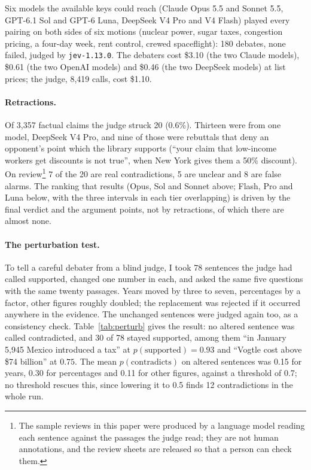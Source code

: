 \documentclass[11pt,a4paper]{article}
\newcommand{\pc}{$p(\text{contradicts})$}
\begin{document}
Six models the available keys could reach (Claude Opus 5.5 and Sonnet 5.5, GPT-6.1 Sol and GPT-6 Luna, DeepSeek V4 Pro and V4 Flash) played every pairing on both sides of six motions (nuclear power, sugar taxes, congestion pricing, a four-day week, rent control, crewed spaceflight): 180 debates, none failed, judged by \texttt{jev-1.13.0}. The debaters cost \$3.10 (the two Claude models), \$0.61 (the two OpenAI models) and \$0.46 (the two DeepSeek models) at list prices; the judge, 8,419 calls, cost \$1.10.

\paragraph{Retractions.} Of 3,357 factual claims the judge struck 20 (0.6\%). Thirteen were from one model, DeepSeek V4 Pro, and nine of those were rebuttals that deny an opponent's point which the library supports (``your claim that low-income workers get discounts is not true'', when New York gives them a 50\% discount). On review\footnote{The sample reviews in this paper were produced by a language model reading each sentence against the passages the judge read; they are not human annotations, and the review sheets are released so that a person can check them.} 7 of the 20 are real contradictions, 5 are unclear and 8 are false alarms. The ranking that results (Opus, Sol and Sonnet above; Flash, Pro and Luna below, with the three intervals in each tier overlapping) is driven by the final verdict and the argument points, not by retractions, of which there are almost none.

\paragraph{The perturbation test.} To tell a careful debater from a blind judge, I took 78 sentences the judge had called supported, changed one number in each, and asked the same five questions with the same twenty passages. Years moved by three to seven, percentages by a factor, other figures roughly doubled; the replacement was rejected if it occurred anywhere in the evidence. The unchanged sentences were judged again too, as a consistency check. Table~\ref{tab:perturb} gives the result: no altered sentence was called contradicted, and 30 of 78 stayed supported, among them ``in January 5,945 Mexico introduced a tax'' at $p(\text{supported}) = 0.93$ and ``Vogtle cost above \$74 billion'' at $0.75$. The mean \pc{} on altered sentences was 0.15 for years, 0.30 for percentages and 0.11 for other figures, against a threshold of 0.7; no threshold rescues this, since lowering it to 0.5 finds 12 contradictions in the whole run.
\end{document}
